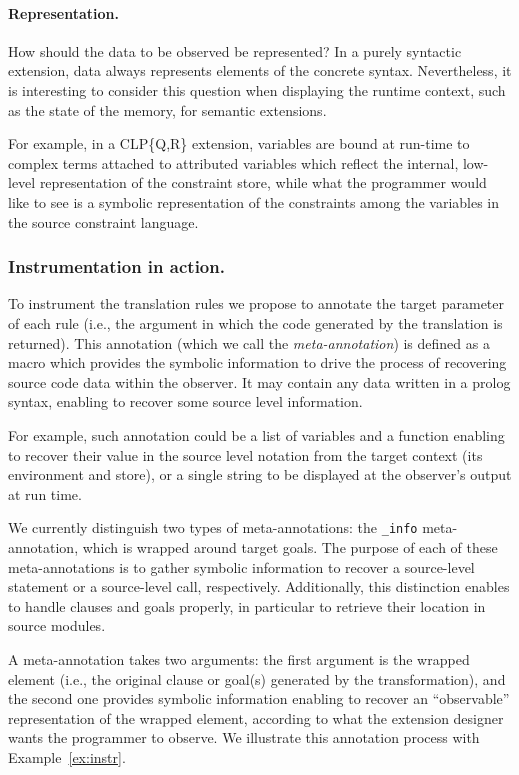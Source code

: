\documentclass[preprint]{llncs}
\newcommand{\pre}[1]{\texttt{#1}}
\begin{document}
\paragraph{Representation.} How should the data to be observed be
represented?  In a purely syntactic extension, data always represents
elements of the concrete syntax. Nevertheless, it is interesting to
consider this question when displaying the runtime context, such as
the state of the memory, for semantic extensions.

For example, in a CLP\{Q,R\} extension, variables are bound at
run-time to complex terms attached to attributed variables which
reflect the internal, low-level representation of the constraint
store, while what the programmer would like to see is a symbolic
representation of the constraints among the variables in the source
constraint language.

\subsubsection{Instrumentation in action.}

To instrument the translation rules we propose to annotate the target
parameter of each rule (i.e., the argument in which the code generated
by the translation is returned). This annotation (which we call the
\emph{meta-annotation}) is defined as a macro which provides the
symbolic information to drive the process of recovering source code
data within the observer. It may contain any data written in a prolog syntax,
enabling to recover some source level information. 

For example, such annotation could be 
a list of variables and a function enabling to recover their value
in the source level notation from the target context (its environment
and store), or a single string to be displayed at the 
observer's output at run time.

We currently distinguish two types of
meta-annotations: the \pre{\goal\_info}
meta-annotation, which is wrapped around target goals. The purpose of
each of these meta-annotations is to gather symbolic information to
recover a source-level statement or a source-level call, respectively.
Additionally, this distinction enables to handle clauses and goals
properly, in particular to retrieve their location in source modules.

A meta-annotation takes two arguments: the first argument is the
wrapped element (i.e., the original clause or goal(s) generated by the
transformation), and the second one provides symbolic information
enabling to recover an ``observable'' representation of the wrapped
element, according to what the extension designer wants the programmer
to observe. 
We illustrate this annotation process with Example~\ref{ex:instr}. 
\end{document}
